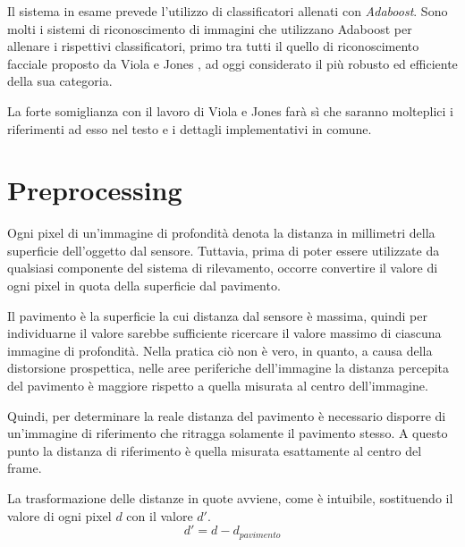 Il sistema in esame prevede l'utilizzo di classificatori allenati con \emph{Adaboost}. Sono molti i sistemi di riconoscimento di immagini che utilizzano Adaboost per allenare i rispettivi classificatori, primo tra tutti il quello di riconoscimento facciale proposto da Viola e Jones \cite{Viola04}, ad oggi considerato il più robusto ed efficiente della sua categoria.

La forte somiglianza con il lavoro di Viola e Jones farà sì che saranno molteplici i riferimenti ad esso nel testo e i dettagli implementativi in comune.


\section{Preprocessing}
\label{sec:preprocessing}
Ogni pixel di un'immagine di profondità denota la distanza in millimetri della superficie dell'oggetto dal sensore. Tuttavia, prima di poter essere utilizzate da qualsiasi componente del sistema di rilevamento, occorre convertire il valore di ogni pixel in quota della superficie dal pavimento.

Il pavimento è la superficie la cui distanza dal sensore è massima, quindi per individuarne il valore sarebbe sufficiente ricercare il valore massimo di ciascuna immagine di profondità.
Nella pratica ciò non è vero, in quanto, a causa della distorsione prospettica, nelle aree periferiche dell'immagine la distanza percepita del pavimento è maggiore rispetto a quella misurata al centro dell'immagine.

Quindi, per determinare la reale distanza del pavimento è necessario disporre di un'immagine di riferimento che ritragga solamente il pavimento stesso. A questo punto la distanza di riferimento è quella misurata esattamente al centro del frame.

La trasformazione delle distanze in quote avviene, come è intuibile, sostituendo il valore di ogni pixel $d$ con il valore $d'$.
\begin{equation}
    d' = d - d_{pavimento}
    \label{eq:floor_distance}
\end{equation}
